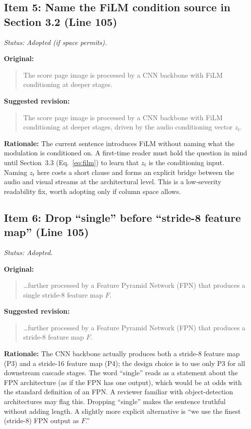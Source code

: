 \documentclass{article}
\begin{document}
\subsection*{Item 5: Name the FiLM condition source in Section 3.2 (Line 105)}

\textit{Status: Adopted (if space permits).}

\textbf{Original:}
\begin{quote}
The score page image is processed by a CNN backbone with FiLM conditioning at deeper stages.
\end{quote}

\textbf{Suggested revision:}
\begin{quote}
The score page image is processed by a CNN backbone with FiLM conditioning at deeper stages, driven by the audio conditioning vector $z_t$.
\end{quote}

\textbf{Rationale:}
The current sentence introduces FiLM without naming what the modulation is conditioned on. A first-time reader must hold the question in mind until Section~3.3 (Eq.~\ref{eq:film}) to learn that $z_t$ is the conditioning input. Naming $z_t$ here costs a short clause and forms an explicit bridge between the audio and visual streams at the architectural level. This is a low-severity readability fix, worth adopting only if column space allows.

\subsection*{Item 6: Drop ``single'' before ``stride-8 feature map'' (Line 105)}

\textit{Status: Adopted.}

\textbf{Original:}
\begin{quote}
\ldots further processed by a Feature Pyramid Network (FPN) that produces a single stride-8 feature map $F$.
\end{quote}

\textbf{Suggested revision:}
\begin{quote}
\ldots further processed by a Feature Pyramid Network (FPN) that produces a stride-8 feature map $F$.
\end{quote}

\textbf{Rationale:}
The CNN backbone actually produces both a stride-8 feature map (P3) and a stride-16 feature map (P4); the design choice is to use only P3 for all downstream cascade stages. The word ``single'' reads as a statement about the FPN architecture (as if the FPN has one output), which would be at odds with the standard definition of an FPN. A reviewer familiar with object-detection architectures may flag this. Dropping ``single'' makes the sentence truthful without adding length. A slightly more explicit alternative is ``we use the finest (stride-8) FPN output as $F$.''
\end{document}

